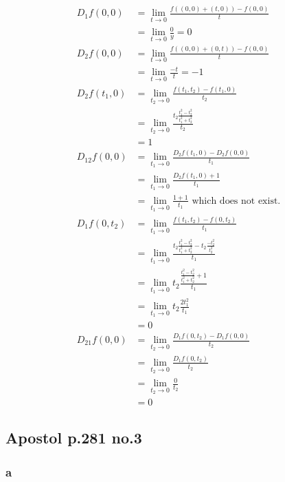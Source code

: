 \documentclass[12pt,letterpaper]{article}
\theoremstyle{definition}
\begin{document}
\begin{align*}
  D_1f(0, 0) &= \lim_{t\rightarrow 0}\frac{f((0,0) + (t,0)) - f(0,0)}{t} \\
             &= \lim_{t\rightarrow 0}\frac{0}{y} = 0 \\
  D_2f(0, 0) &= \lim_{t\rightarrow 0}\frac{f((0,0) + (0,t)) - f(0,0)}{t} \\
             &= \lim_{t\rightarrow 0} \frac{-t}{t} = -1 \\
  D_2f(t_1, 0) &= \lim_{t_2\rightarrow 0} \frac{f(t_1, t_2) - f(t_1, 0)}{t_2} \\
             &= \lim_{t_2\rightarrow 0} \frac{t_2\frac{t_1^2-t_2^2}{t_1^2+t_2^2}}{t_2} \\
             &= 1 \\
  D_{12}f(0,0) &= \lim_{t_1\rightarrow 0} \frac{D_2f(t_1,0) - D_2f(0,0)}{t_1} \\
             &= \lim_{t_1\rightarrow 0} \frac{D_2f(t_1,0) + 1}{t_1} \\
             &= \lim_{t_1\rightarrow 0} \frac{1 + 1}{t_1} \text{ which does not exist.} \\
  D_1f(0, t_2) &= \lim_{t_1\rightarrow 0} \frac{f(t_1, t_2) - f(0, t_2)}{t_1} \\
             &= \lim_{t_1\rightarrow 0} \frac{t_2\frac{t_1^2-t_2^2}{t_1^2+t_2^2} - t_2\frac{-t_2^2}{t_2^2}}{t_1} \\
             &= \lim_{t_1\rightarrow 0}t_2\frac{\frac{t_1^2-t_2^2}{t_1^2+t_2^2} + 1}{t_1} \\
             &= \lim_{t_1\rightarrow 0}t_2\frac{2t_1^2}{t_1} \\
             &= 0 \\
  D_{21}f(0,0) &= \lim_{t_2\rightarrow 0} \frac{D_1f(0,t_2) - D_1f(0,0)}{t_2} \\
             &= \lim_{t_2\rightarrow 0} \frac{D_1f(0,t_2)}{t_2} \\
             &= \lim_{t_2\rightarrow 0} \frac{0}{t_2} \\
             &= 0
\end{align*}


\subsection*{Apostol p.281 no.3}

\subsubsection*{a}
\end{document}
